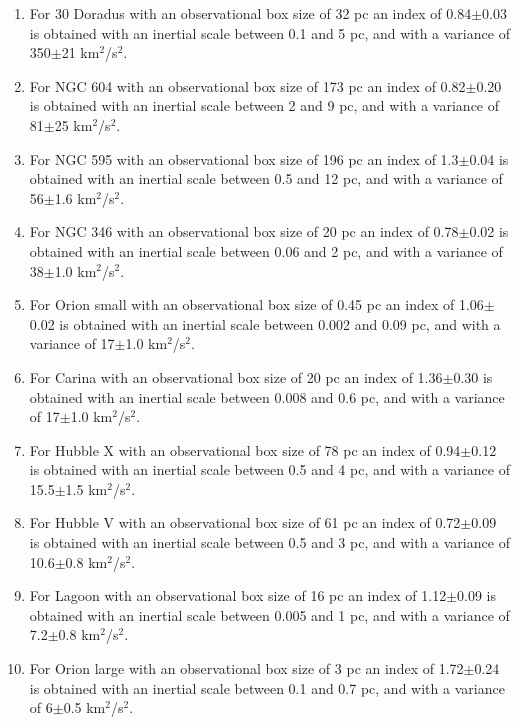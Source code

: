\documentclass[fleqn,usenatbib, useAMS, a4paper]{mnras}
\begin{document}
\begin{enumerate}
\item For 30 Doradus with an observational box size of 32 pc an index of 0.84$\pm$0.03 is obtained with an inertial scale between 0.1 and 5 pc, and with a variance of 350$\pm$21 km$^2$/s$^2$. 
    
\item For NGC 604 with an observational box size of 173 pc an index of 0.82$\pm$0.20 is obtained with an inertial scale between 2 and 9 pc, and with a variance of 81$\pm$25 km$^2$/s$^2$.
    
\item For NGC 595 with an observational box size of 196 pc an index of 1.3$\pm$0.04 is obtained with an inertial scale between 0.5 and 12 pc, and with a variance of 56$\pm$1.6 km$^2$/s$^2$.

\item For NGC 346 with an observational box size of 20 pc an index of 0.78$\pm$0.02 is obtained with an inertial scale between 0.06 and 2 pc, and with a variance of 38$\pm$1.0 km$^2$/s$^2$.

\item For Orion small with an observational box size of 0.45 pc an index of 1.06$\pm$0.02 is obtained with an inertial scale between 0.002 and 0.09 pc, and with a variance of 17$\pm$1.0 km$^2$/s$^2$.

\item For Carina with an observational box size of 20 pc an index of 1.36$\pm$0.30 is obtained with an inertial scale between 0.008 and 0.6 pc, and with a variance of 17$\pm$1.0 km$^2$/s$^2$.

\item For Hubble X with an observational box size of 78 pc an index of 0.94$\pm$0.12 is obtained with an inertial scale between 0.5 and 4 pc, and with a variance of 15.5$\pm$1.5 km$^2$/s$^2$.

\item For Hubble V with an observational box size of 61 pc an index of 0.72$\pm$0.09 is obtained with an inertial scale between 0.5 and 3 pc, and with a variance of 10.6$\pm$0.8 km$^2$/s$^2$.

\item For Lagoon with an observational box size of 16 pc an index of 1.12$\pm$0.09 is obtained with an inertial scale between 0.005 and 1 pc, and with a variance of 7.2$\pm$0.8 km$^2$/s$^2$.

\item For Orion large with an observational box size of 3 pc an index of 1.72$\pm$0.24 is obtained with an inertial scale between 0.1 and 0.7 pc, and with a variance of 6$\pm$0.5 km$^2$/s$^2$.

    
\end{enumerate}
\end{document}

